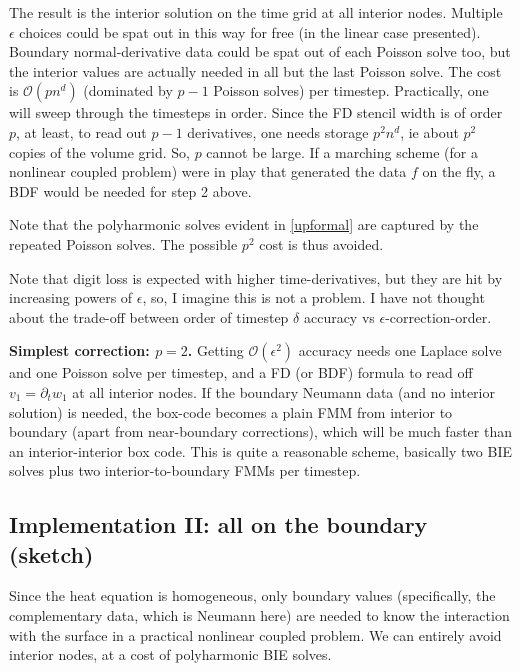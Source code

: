 \documentclass[10pt]{article}
\newcommand{\bigO}{{\mathcal O}}
\newcommand{\eps}{\epsilon}
\newcommand{\dt}{\partial_t}
\begin{document}
The result is the interior solution on the time grid at all interior nodes.
Multiple $\eps$ choices could be spat out in this way for free
(in the linear case presented).
Boundary normal-derivative
data could be spat out of each Poisson solve too, but the interior
values are actually needed in all but the last Poisson solve.
The cost is $\bigO(pn^d)$ (dominated by $p-1$ Poisson solves)
per timestep.
Practically, one will sweep through the timesteps in order.
Since the FD stencil width is of order $p$, at least,
to read out $p-1$ derivatives, one needs storage $p^2n^d$,
ie about $p^2$ copies of the volume grid.
So, $p$ cannot be large.
If a marching scheme (for a nonlinear coupled problem) were in play
that generated the data $f$ on the fly,
a BDF would be needed for step 2 above.

Note that the polyharmonic solves evident in \eqref{upformal}
are captured by the repeated Poisson solves. The possible $p^2$ cost is
thus avoided.

Note that digit loss is expected with higher time-derivatives,
but they are hit by increasing powers of $\eps$, so, I imagine this
is not a problem.
I have not thought about the trade-off between order of timestep $\delta$
accuracy vs $\eps$-correction-order.

{\bf Simplest correction: $p=2$.}
Getting $\bigO(\eps^2)$ accuracy needs one Laplace solve
and one Poisson solve per timestep, and a FD (or BDF) formula
to read off $v_1 = \dt w_1$ at all interior nodes.
If the boundary Neumann data (and no interior solution) is needed,
the box-code becomes a plain FMM from interior to boundary
(apart from near-boundary corrections), which will be much faster than
an interior-interior box code.
This is quite a reasonable scheme, basically two
BIE solves plus two interior-to-boundary FMMs per timestep.



\subsection{Implementation II: all on the boundary (sketch)}

Since the heat equation is homogeneous, only boundary values
(specifically, the complementary data, which is Neumann here)
are needed to know the interaction with the surface in a practical
nonlinear coupled problem.
We can entirely avoid interior nodes,
at a cost of polyharmonic BIE solves.
\end{document}
